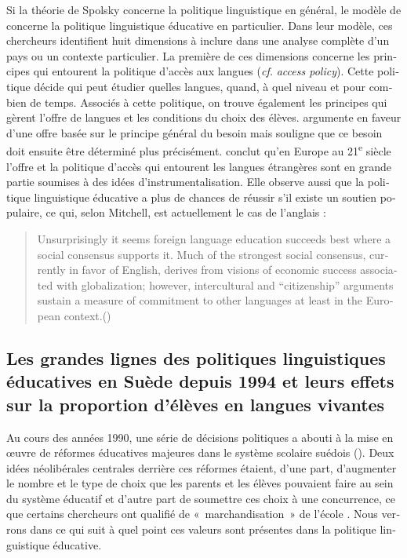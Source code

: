 \documentclass[french, output=paper]{langscibook}
\begin{document}
\begin{otherlanguage}{french}
\largerpage
Si la théorie de Spolsky concerne la politique linguistique en général, le modèle de \citet{KaplanBaldauf2005} concerne la politique linguistique éducative en particulier. Dans leur modèle, ces chercheurs identifient huit dimensions à inclure dans une analyse complète d’un pays ou un contexte particulier. La première de ces dimensions concerne les principes qui entourent la politique d’accès aux langues (\textit{cf.} \textit{access policy}). Cette politique décide qui peut étudier quelles langues, quand, à quel niveau et pour combien de temps. Associés à cette politique, on trouve également les principes qui gèrent l’offre de langues et les conditions du choix des élèves.  argumente en faveur d’une offre basée sur le principe général du besoin mais souligne que ce besoin doit ensuite être déterminé plus précisément.  conclut qu’en Europe au 21\textsuperscript{e} siècle l’offre et la politique d’accès qui entourent les langues étrangères sont en grande partie soumises à des idées d’instrumentalisation. Elle observe aussi que la politique linguistique éducative a plus de chances de réussir s’il existe un soutien populaire, ce qui, selon Mitchell, est actuellement le cas de l’anglais : 

\begin{quote}
Unsurprisingly it seems foreign language education succeeds best where a social consensus supports it. Much of the strongest social consensus, currently in favor of English, derives from visions of economic success associated with globalization; however, intercultural and “citizenship” arguments sustain a measure of commitment to other languages at least in the European context.\hbox{}\hfill\hbox{(\citealt[98]{Mitchell2009})}
\end{quote}

\subsection{Les grandes lignes des politiques linguistiques éducatives en Suède depuis 1994 et leurs effets sur la proportion d’élèves en langues vivantes}\label{sec:granfeldt:3.2}

Au cours des années 1990, une série de décisions politiques a abouti à la mise en œuvre de réformes éducatives majeures dans le système scolaire suédois (\citealt{YangHansenGustafsson2016}). Deux idées néolibérales centrales derrière ces réformes étaient, d’une part, d'augmenter le nombre et le type de choix que les parents et les élèves pouvaient faire au sein du système éducatif \citep{Miron1993} et d’autre part de soumettre ces choix à une concurrence, ce que certains chercheurs ont qualifié de «~marchandisation~» de l’école \citep{LundahlEtAl2013}. Nous verrons dans ce qui suit à quel point ces valeurs sont présentes dans la politique linguistique éducative. 


\end{otherlanguage}
\end{document}
